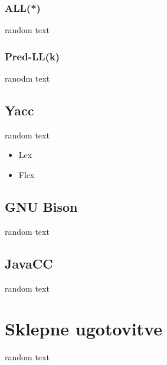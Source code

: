 \documentclass[a4paper, 12pt, tikz, border=5]{book}
\begin{document}
\subsection{ALL(*)}
random text

\subsection{Pred-LL(k)}
ranodm text


\section{Yacc}
random text

\begin{itemize}  
\item Lex
\item Flex
\end{itemize}

\section{GNU Bison}
random text

\section{JavaCC}
random text



\chapter{Sklepne ugotovitve}  %
\label{chConclusion}
random text



\newpage %
\ \\
\clearpage
{}


\end{document}

